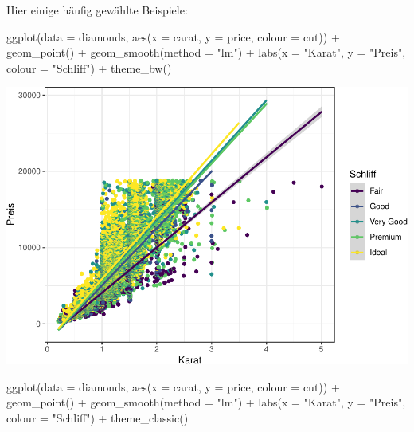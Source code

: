 \documentclass[
]{book}
\newenvironment{Shaded}{\begin{snugshade}}{\end{snugshade}}
\newcommand{\AttributeTok}[1]{\textcolor[rgb]{0.77,0.63,0.00}{#1}}
\newcommand{\FunctionTok}[1]{\textcolor[rgb]{0.00,0.00,0.00}{#1}}
\newcommand{\NormalTok}[1]{#1}
\newcommand{\SpecialCharTok}[1]{\textcolor[rgb]{0.00,0.00,0.00}{#1}}
\newcommand{\StringTok}[1]{\textcolor[rgb]{0.31,0.60,0.02}{#1}}
\begin{document}
Hier einige häufig gewählte Beispiele:

\begin{Shaded}
\begin{Highlighting}[]
\FunctionTok{ggplot}\NormalTok{(}\AttributeTok{data =}\NormalTok{ diamonds, }\FunctionTok{aes}\NormalTok{(}\AttributeTok{x =}\NormalTok{ carat, }\AttributeTok{y =}\NormalTok{ price, }\AttributeTok{colour =}\NormalTok{ cut)) }\SpecialCharTok{+}
  \FunctionTok{geom\_point}\NormalTok{() }\SpecialCharTok{+}
  \FunctionTok{geom\_smooth}\NormalTok{(}\AttributeTok{method =} \StringTok{"lm"}\NormalTok{) }\SpecialCharTok{+}
  \FunctionTok{labs}\NormalTok{(}\AttributeTok{x =} \StringTok{"Karat"}\NormalTok{, }\AttributeTok{y =} \StringTok{"Preis"}\NormalTok{, }\AttributeTok{colour =} \StringTok{"Schliff"}\NormalTok{) }\SpecialCharTok{+}
  \FunctionTok{theme\_bw}\NormalTok{()}
\end{Highlighting}
\end{Shaded}

\includegraphics{CFH_R_bookdown_files/figure-latex/unnamed-chunk-181-1.pdf}

\begin{Shaded}
\begin{Highlighting}[]
\FunctionTok{ggplot}\NormalTok{(}\AttributeTok{data =}\NormalTok{ diamonds, }\FunctionTok{aes}\NormalTok{(}\AttributeTok{x =}\NormalTok{ carat, }\AttributeTok{y =}\NormalTok{ price, }\AttributeTok{colour =}\NormalTok{ cut)) }\SpecialCharTok{+}
  \FunctionTok{geom\_point}\NormalTok{() }\SpecialCharTok{+}
  \FunctionTok{geom\_smooth}\NormalTok{(}\AttributeTok{method =} \StringTok{"lm"}\NormalTok{) }\SpecialCharTok{+}
  \FunctionTok{labs}\NormalTok{(}\AttributeTok{x =} \StringTok{"Karat"}\NormalTok{, }\AttributeTok{y =} \StringTok{"Preis"}\NormalTok{, }\AttributeTok{colour =} \StringTok{"Schliff"}\NormalTok{) }\SpecialCharTok{+}
  \FunctionTok{theme\_classic}\NormalTok{()}
\end{Highlighting}
\end{Shaded}
\end{document}
